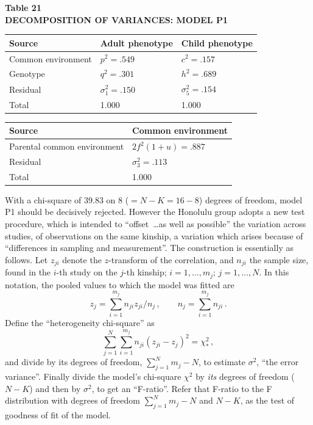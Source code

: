 ﻿\documentclass[12pt]{article}
\begin{document}
\begin{center}
\textbf{Table 21}\\
\textbf{DECOMPOSITION OF VARIANCES: MODEL P1}
\end{center}
\begin{center}
\begin{tabular}{l l l}
\hline
Source & Adult phenotype & Child phenotype \\
\hline
Common environment & $p^2=.549$ & $c^2=.157$ \\
Genotype & $q^2=.301$ & $h^2=.689$ \\
Residual & $\sigma_1^2=.150$ & $\sigma_5^2=.154$ \\
\hline
Total & 1.000 & 1.000 \\
\hline
\end{tabular}
\qquad
\begin{tabular}{l l}
\hline
Source & Common environment \\
\hline
Parental common environment & $2f^2(1+u)=.887$ \\
Residual & $\sigma_3^2=.113$ \\
\hline
Total & 1.000 \\
\hline
\end{tabular}
\end{center}

With a chi-square of 39.83 on 8 ($=N-K=16-8$) degrees of freedom, model P1 should be decisively rejected. However the Honolulu group adopts a new test procedure, which is intended to ``offset~\ldots as well as possible'' the variation across studies, of observations on the same kinship, a variation which arises because of ``differences in sampling and measurement''. The construction is essentially as follows. Let $z_{ji}$ denote the $z$-transform of the correlation, and $n_{ji}$ the sample size, found in the $i$-th study on the $j$-th kinship; $i=1,\ldots,m_j$; $j=1,\ldots,N$. In this notation, the pooled values to which the model was fitted are
\begin{equation*}
z_j = \sum_{i=1}^{m_j} n_{ji} z_{ji}/n_j \, , \qquad n_j = \sum_{i=1}^{m_j} n_{ji} \, .
\end{equation*}
Define the ``heterogeneity chi-square'' as
\begin{equation*}
\sum_{j=1}^{N}\sum_{i=1}^{m_j} n_{ji}(z_{ji}-z_j)^2 = \chi_*^2 \, ,
\end{equation*}
and divide by its degrees of freedom, $\sum_{j=1}^N m_j - N$, to estimate $\sigma^2$, ``the error variance''. Finally divide the model's chi-square $\chi^2$ by \emph{its} degrees of freedom ($N-K$) and then by $\sigma^2$, to get an ``F-ratio''. Refer that F-ratio to the F distribution with degrees of freedom $\sum_{j=1}^N m_j - N$ and $N-K$, as the test of goodness of fit of the model.
\end{document}
